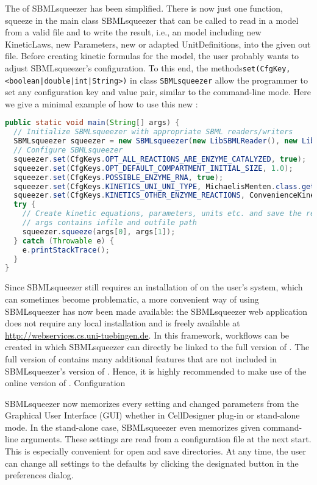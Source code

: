 The \API of SBMLsqueezer has been simplified.
There is now just one function, squeeze in the main class SBMLsqueezer that can
be called to read in a model from a valid \SBML file and to write the result,
i.e., an \SBML model including new KineticLaws, new Parameters, new or adapted
UnitDefinitions, into the given out file. Before creating kinetic formulas for
the model, the user probably wants to adjust SBMLsqueezer's configuration.
To this end, the methods\texttt{set(CfgKey, <boolean|double|int|String>)} in class
\texttt{SBMLsqueezer} allow the programmer to set any configuration key and value pair,
similar to the command-line mode. Here we give a minimal example of how to use
this new \API:
\begin{lstlisting}[language=Java, caption={Usage of SBMLsqueezer 1.3 via its \acs{API}}]
public static void main(String[] args) {
  // Initialize SBMLsqueezer with appropriate SBML readers/writers
  SBMLsqueezer squeezer = new SBMLsqueezer(new LibSBMLReader(), new LibSBMLWriter());
  // Configure SBMLsqueezer
  squeezer.set(CfgKeys.OPT_ALL_REACTIONS_ARE_ENZYME_CATALYZED, true);
  squeezer.set(CfgKeys.OPT_DEFAULT_COMPARTMENT_INITIAL_SIZE, 1.0);
  squeezer.set(CfgKeys.POSSIBLE_ENZYME_RNA, true);
  squeezer.set(CfgKeys.KINETICS_UNI_UNI_TYPE, MichaelisMenten.class.getName());
  squeezer.set(CfgKeys.KINETICS_OTHER_ENZYME_REACTIONS, ConvenienceKinetics.class.getName());
  try {
    // Create kinetic equations, parameters, units etc. and save the result
    // args contains infile and outfile path
    squeezer.squeeze(args[0], args[1]);
  } catch (Throwable e) {
    e.printStackTrace();
  }
}
\end{lstlisting}
Since SBMLsqueezer still requires an installation of \libSBML on the user's
system, which can sometimes become problematic, a more convenient way of using
SBMLsqueezer has now been made available: the SBMLsqueezer web application does
not require any local installation and is freely available at
\url{http://webservices.cs.uni-tuebingen.de}. In this framework, workflows can
be created in which SBMLsqueezer can directly be linked to the full version of
\SBMLLaTeX. The full version of \SBMLLaTeX contains many additional features
that are not included in SBMLsqueezer's version of \SBMLLaTeX. Hence, it is
highly recommended to make use of the online version of \SBMLLaTeX.
Configuration

SBMLsqueezer now memorizes every setting and changed parameters from the
Graphical User Interface (GUI) whether in CellDesigner plug-in or stand-alone
mode. In the stand-alone case, SBMLsqueezer even memorizes given command-line
arguments. These settings are read from a configuration file at the next start.
This is especially convenient for open and save directories. At any time, the
user can change all settings to the defaults by clicking the designated button
in the preferences dialog.

